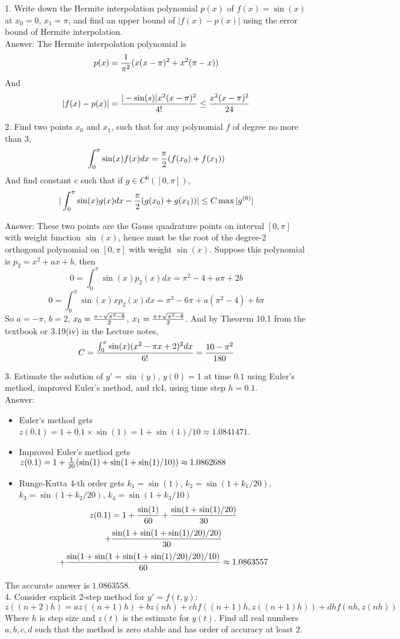 \documentclass{article} %
\theoremstyle{break}
\begin{document}
1. Write down the Hermite interpolation polynomial $p(x)$ of $f(x)=\sin(x)$ at $x_0=0$, $x_1=\pi$, and find an upper bound of $|f(x)-p(x)|$ using the error bound of Hermite interpolation.\\

Answer: The Hermite interpolation polynomial is
\[p(x)={1\over \pi^2}(x(x-\pi)^2+x^2(\pi-x))\]
And
\[|f(x)-p(x)|={|-\sin(s)|x^2(x-\pi)^2\over 4!}\leq{x^2(x-\pi)^2\over 24}\]

2. Find two points $x_0$ and $x_1$, such that for any polynomial $f$ of degree no more than $3$,
\[\int_0^\pi\sin(x)f(x)dx={\pi\over 2}(f(x_0)+f(x_1))\]
And find constant $c$ such that if $g\in C^6([0, \pi])$,
\[|\int_0^\pi\sin(x)g(x)dx-{\pi\over 2}(g(x_0)+g(x_1))|\leq C\max|g^{(6)}|\]

Answer: These two points are the Gauss quadrature points on interval $[0, \pi]$ with weight function $\sin(x)$, hence must be the root of the degree-2 orthogonal polynomial on $[0, \pi]$ with weight $\sin(x)$. Suppose this polynomial is $p_2=x^2+ax+b$, then
\[0=\int_0^\pi \sin(x)p_2(x)dx=\pi^2-4+a\pi+2b\]
\[0=\int_0^\pi \sin(x)xp_2(x)dx=\pi^3-6\pi+a(\pi^2-4)+b\pi\]
So $a=-\pi$, $b=2$, $x_0={\pi-\sqrt{\pi^2-8}\over 2}$, $x_1={\pi+\sqrt{\pi^2-8}\over 2}$.
And by Theorem 10.1 from the textbook or 3.19(iv) in the Lecture notes,
\[C={\int_0^\pi\sin(x)(x^2-\pi x+2)^2dx\over 6!}={10-\pi^2\over 180}\]

3. Estimate the solution of $y'=\sin(y)$, $y(0)=1$ at time $0.1$ using Euler's method, improved Euler's method, and rk4, using time step $h=0.1$. \\

Answer:
\begin{itemize}
\item Euler's method gets $z(0.1)=1+0.1\times\sin(1)=1+\sin(1)/10\approx 1.0841471$.
\item Improved Euler's method gets $z(0.1)=1+{1\over 20}(\sin(1)+\sin(1+\sin(1)/10))\approx 1.0862688$
\item Runge-Kutta 4-th order gets $k_1=\sin(1)$, $k_2=\sin(1+k_1/20)$, $k_3=\sin(1+k_2/20)$, $k_4=\sin(1+k_3/10)$
  \[z(0.1)=1+{\sin(1)\over 60}+{\sin(1+\sin(1)/20)\over 30}\]
  \[+{\sin(1+\sin(1+\sin(1)/20)/20)\over 30}\]
  \[+{\sin(1+\sin(1+\sin(1+\sin(1)/20)/20)/10)\over 60}\approx 1.0863557\]
\end{itemize}
The accurate answer is $1.0863558$.\\


4. Consider explicit 2-step method for $y'=f(t, y)$:
\[z((n+2)h)=az((n+1)h)+bz(nh)+chf((n+1)h, z((n+1)h))+dhf(nh, z(nh))\]
Where $h$ is step size and $z(t)$ is the estimate for $y(t)$. Find all real numbers $a, b, c, d$ such that the method is zero stable and has order of accuracy at least $2$.
\end{document}
